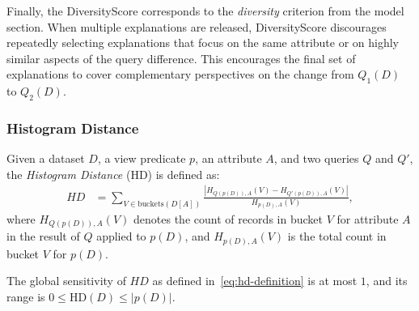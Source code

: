 Finally, the DiversityScore corresponds to the \emph{diversity}
criterion from the model section. When multiple explanations are
released, DiversityScore discourages repeatedly selecting explanations
that focus on the same attribute or on highly similar aspects of the
query difference. This encourages the final set of explanations to
cover complementary perspectives on the change from $Q_1(D)$ to
$Q_2(D)$.

\subsubsection{Histogram Distance}

\begin{definition}  
Given a dataset $D$, a view predicate $p$, an attribute $A$, 
and two queries $Q$ and $Q'$,  
the \emph{Histogram Distance} (HD) is defined as:
\begin{align}
HD &= \sum_{V \in \text{buckets}(D[A])} 
\frac{\left| H_{Q(p(D)),A}(V) - H_{Q'(p(D)),A}(V) \right|}
     {H_{p(D),A}(V)},
\label{eq:hd-definition}
\end{align}
where $H_{Q(p(D)),A}(V)$ denotes the count of records in bucket $V$ for attribute $A$
in the result of $Q$ applied to $p(D)$,  
and $H_{p(D),A}(V)$ is the total count in bucket $V$ for $p(D)$.
\end{definition}

\begin{proposition}
The global sensitivity of $HD$ as defined in~\eqref{eq:hd-definition} is at most $1$, and its range is $0 \le \mathrm{HD}(D) \le |p(D)|$.
\end{proposition}

